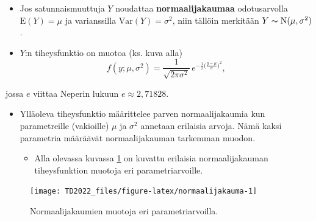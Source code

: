 \documentclass[
]{book}
\providecommand{\tightlist}{%
  \setlength{\itemsep}{0pt}\setlength{\parskip}{0pt}}
\begin{document}
\begin{itemize}
\item
  Jos satunnaismuuttuja \(Y\) noudattaa \textbf{normaalijakaumaa} odotusarvolla \(\text{E}(Y)= \mu\) ja varianssilla \(\mathrm{Var}(Y) = \sigma^2\), niin tällöin merkitään \(Y \thicksim \text{N}(\mu, \sigma^2)\).
\item
  \(Y\):n tiheysfunktio on muotoa (ks. kuva alla)
  \[
  f(y; \mu, \sigma^2) = \frac{1}{\sqrt{2 \pi \sigma^2}} \, e^{-\frac{1}{2} \Big(\frac{y- \mu}{\sigma} \Big)^2}, 
  \]
\end{itemize}

jossa \(e\) viittaa Neperin lukuun \(e \approx 2,71828\).

\begin{itemize}
\tightlist
\item
  Ylläoleva tiheysfunktio määrittelee parven normaalijakaumia kun parametreille (vakioille) \(\mu\) ja \(\sigma^2\) annetaan erilaisia arvoja. Nämä kaksi parametria määräävät normaalijakauman tarkemman muodon.

  \begin{itemize}
  \tightlist
  \item
    Alla olevassa kuvassa \ref{fig:normaalijakauma} on kuvattu erilaisia normaalijakauman tiheysfunktion muotoja eri parametriarvoille.
  \end{itemize}
\end{itemize}

\begin{figure}

{\centering \texttt{[image: TD2022\_files/figure-latex/normaalijakauma-1]} 

}

\caption{Normaalijakaumien muotoja eri parametriarvoilla.}\label{fig:normaalijakauma}
\end{figure}
\end{document}
